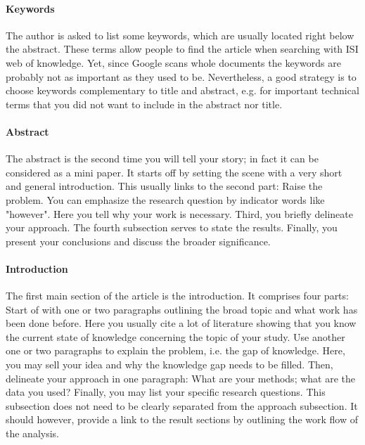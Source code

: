 \documentclass[justified, notoc]{tufte-book} %
\begin{document}
\paragraph{Keywords}
The author is asked to list some keywords, %
which are usually located right below the abstract. These terms allow people to find the article when searching with ISI web of knowledge. Yet, since Google scans whole documents the keywords are probably not as important as they used to be. Nevertheless, a good strategy is to choose keywords complementary to title and abstract, e.g. for important technical terms that you
did not want to include in the abstract nor title.\\

\paragraph{Abstract}
The abstract %
is the second time you will tell your story; in fact it can be considered as a mini paper. It starts off by setting the scene with a very short and general introduction. This usually links to the second part: Raise the problem. You can emphasize the research question by indicator words like "however". Here you tell why your work is necessary. Third, you briefly delineate your approach. The fourth subsection serves to state the results. Finally, you present your conclusions and discuss the broader significance.\\

\paragraph{Introduction}
The first main section of the article is the introduction. %
It comprises four parts: Start of with one or two paragraphs outlining the broad topic and what work has been done before. Here you usually cite a lot of literature showing that you know the current state of knowledge concerning the topic of your study.
Use another one or two paragraphs to explain the problem, i.e. the gap of knowledge. Here, you may sell your idea and why the knowledge gap needs to be filled.
Then, delineate your approach in one paragraph: What are your methods; what are the data you used?
Finally, you may list your specific research questions. This subsection does not need to be clearly separated from the approach subsection. It should however, provide a link to the result sections by outlining the work flow of the analysis.\\
\end{document}
